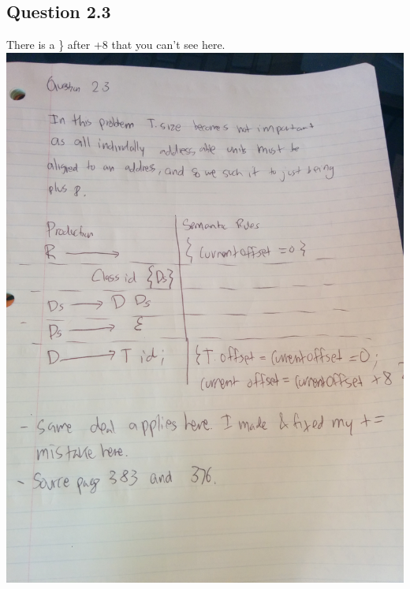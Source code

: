 \documentclass[11pt, oneside]{article}   	%
\begin{document}
\subsection*{Question 2.3}
\par There is a \} after +8 that you can't see here.
\\
\includegraphics[scale=0.18]{IMG_20141011_155225.jpg}
\end{document}

